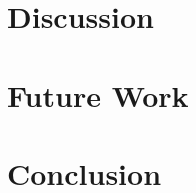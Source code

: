\documentclass[10pt,twocolumn,letterpaper]{article}
\begin{document}
\section{Discussion}

\section{Future Work}

\section{Conclusion}



{\small


}
\end{document}
